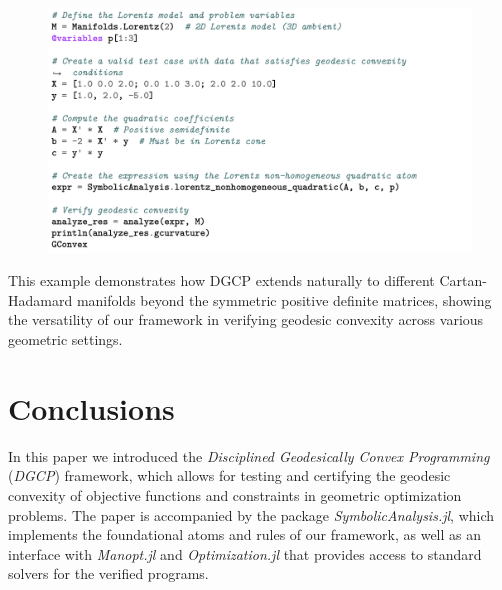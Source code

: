 \documentclass[twoside,11pt]{article}
\begin{document}
\begin{figure}[h!]
    \centering
    \includegraphics[width=\linewidth]{listing/8.png}
\end{figure}

This example demonstrates how DGCP extends naturally to different Cartan-Hadamard manifolds beyond the symmetric positive definite matrices, showing the versatility of our framework in verifying geodesic convexity across various geometric settings.
\newpage
\section{Conclusions}
In this paper we introduced the \emph{Disciplined Geodesically Convex Programming} (\emph{DGCP}) framework, which allows for testing and certifying the geodesic convexity of objective functions and constraints in geometric optimization problems. The paper is accompanied by the package \textsl{SymbolicAnalysis.jl}, which implements the foundational atoms and rules of our framework, as well as an interface with \textsl{Manopt.jl} and \textsl{Optimization.jl} that provides access to standard solvers for the verified programs.
\end{document}
